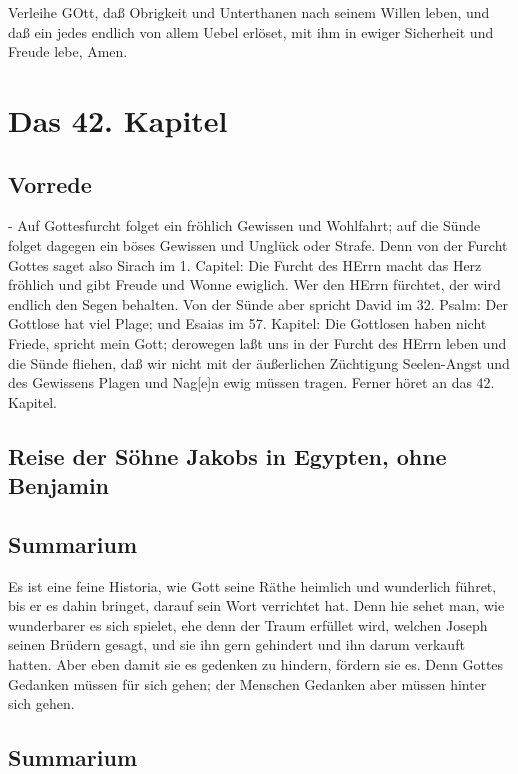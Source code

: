 Verleihe GOtt, daß Obrigkeit und Unterthanen nach seinem Willen leben, und daß ein jedes endlich von allem Uebel erlöset, mit ihm in ewiger Sicherheit und Freude lebe, Amen.

\chapter{Das 42. Kapitel}

\section{Vorrede}

- Auf Gottesfurcht folget ein fröhlich Gewissen und Wohlfahrt; auf die Sünde folget dagegen ein böses Gewissen und Unglück oder Strafe. Denn von der Furcht Gottes saget also Sirach im 1. Capitel: Die Furcht des HErrn macht das Herz fröhlich und gibt Freude und Wonne ewiglich. Wer den HErrn fürchtet, der wird endlich den Segen behalten. Von der Sünde aber spricht David im 32. Psalm: Der Gottlose hat viel Plage; und Esaias im 57. Kapitel: Die Gottlosen haben nicht Friede, spricht mein Gott; derowegen laßt uns in der Furcht des HErrn leben und die Sünde fliehen, daß wir nicht mit der äußerlichen Züchtigung Seelen-Angst und des Gewissens Plagen und Nag[e]n ewig müssen tragen. Ferner höret an das 42. Kapitel.

\section{Reise der Söhne Jakobs in Egypten, ohne Benjamin}

\section{Summarium}

Es ist eine feine Historia, wie Gott seine Räthe heimlich und wunderlich führet, bis er es dahin bringet, darauf sein Wort verrichtet hat. Denn hie sehet man, wie wunderbarer es sich spielet, ehe denn der Traum erfüllet wird, welchen Joseph seinen Brüdern gesagt, und sie ihn gern gehindert und ihn darum verkauft hatten. Aber eben damit sie es gedenken zu hindern, fördern sie es. Denn Gottes Gedanken müssen für sich gehen; der Menschen Gedanken aber müssen hinter sich gehen.

\section{Summarium}

